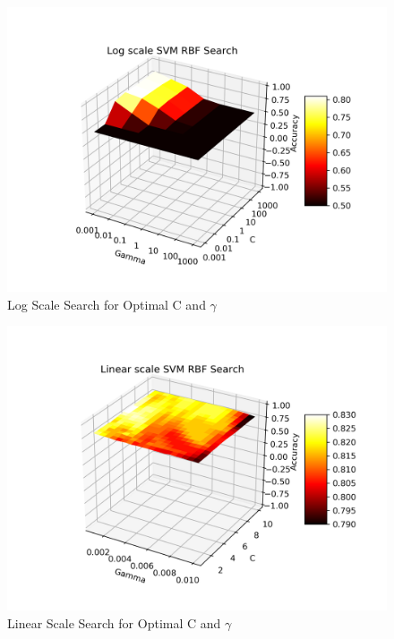 \documentclass[12pt]{article}%
\begin{document}
\begin{figure}[htbp]
\centerline{\includegraphics[width=0.9\linewidth]{../Graphs/log_scale_rbf_search.png}}
\caption{Log Scale Search for Optimal C and $\gamma$}
\label{logsearch}
\end{figure}

\begin{figure}[htbp]
\centerline{\includegraphics[width=0.9\linewidth]{../Graphs/linear_scale_rbf_search.png}}
\caption{Linear Scale Search for Optimal C and $\gamma$}
\label{linsearch}
\end{figure}
\end{document}
